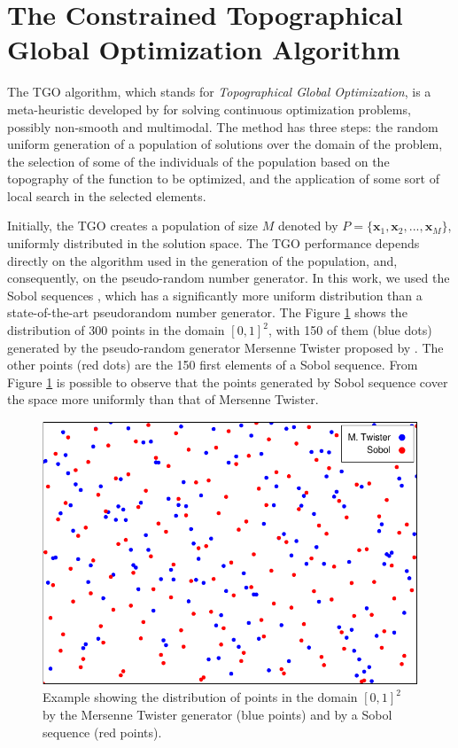 \section{The Constrained Topographical Global Optimization Algorithm}\label{sec:Methods}

The TGO algorithm, which stands for \textit{Topographical Global Optimization}, is a meta-heuristic developed by \cite{ITGO1} for solving continuous optimization problems, possibly non-smooth and multimodal. The method has three steps: the random uniform generation of a population of solutions over the domain of the problem, the selection of some of the individuals of the population based on the topography of the function to be optimized, and the application of some sort of local search in the selected elements.

Initially, the TGO creates a population of size $M$ denoted by $P = \{\bm{x}_1, \bm{x}_2, ..., \allowbreak \bm{x}_M\}$, uniformly distributed in the solution space. The TGO performance depends directly on the algorithm used in the generation of the population, and, consequently, on the pseudo-random number generator. In this work, we used the Sobol sequences \citep{Sobol, ITGO3}, which has a significantly more uniform distribution than a state-of-the-art pseudorandom number generator. The Figure \ref{fig:Sobol} shows the distribution of 300 points in the domain $[0, 1]^2$, with 150 of them (blue dots) generated by the pseudo-random generator Mersenne Twister proposed by \cite{mt19937}. The other points (red dots) are the 150 first elements of a Sobol sequence. From Figure \ref{fig:Sobol} is possible to observe that the points generated by Sobol sequence cover the space more uniformly than that of Mersenne Twister.


\begin{figure}[h]
\begin{center}
\includegraphics[scale=0.8]{scatter-crop.pdf}
\end{center}
\captionsetup{justification=centering}
\caption{Example showing the distribution of points in the domain $[0, 1]^2$ by the Mersenne Twister generator (blue points) and by a Sobol sequence (red points). }\label{fig:Sobol}
\end{figure}


